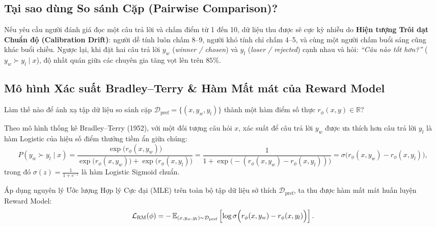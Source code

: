 \subsection{Tại sao dùng So sánh Cặp (Pairwise Comparison)?}
Nếu yêu cầu người đánh giá đọc một câu trả lời và chấm điểm từ 1 đến 10, dữ liệu thu được sẽ cực kỳ nhiễu do \textbf{Hiện tượng Trôi dạt Chuẩn độ (Calibration Drift)}: người dễ tính luôn chấm 8--9, người khó tính chỉ chấm 4--5, và cùng một người chấm buổi sáng cũng khác buổi chiều.
Ngược lại, khi đặt hai câu trả lời $y_w$ (\textit{winner / chosen}) và $y_l$ (\textit{loser / rejected}) cạnh nhau và hỏi: \textit{``Câu nào tốt hơn?''} ($y_w \succ y_l \mid x$), độ nhất quán giữa các chuyên gia tăng vọt lên trên $85\%$.

\subsection{Mô hình Xác suất Bradley--Terry \& Hàm Mất mát của Reward Model}
Làm thế nào để ánh xạ tập dữ liệu so sánh cặp $\mathcal{D}_{\text{pref}} = \{(x, y_w, y_l)\}$ thành một hàm điểm số thực $r_\phi(x, y) \in \mathbb{R}$?

\begin{definition}
Theo mô hình thống kê Bradley--Terry (1952), với một đối tượng câu hỏi $x$, xác suất để câu trả lời $y_w$ được ưa thích hơn câu trả lời $y_l$ là hàm Logistic của hiệu số điểm thưởng tiềm ẩn giữa chúng:
\begin{equation}
    P(y_w \succ y_l \mid x) = \frac{\exp\big(r_\phi(x, y_w)\big)}{\exp\big(r_\phi(x, y_w)\big) + \exp\big(r_\phi(x, y_l)\big)} = \frac{1}{1 + \exp\big(-(r_\phi(x, y_w) - r_\phi(x, y_l))\big)} = \sigma\big(r_\phi(x, y_w) - r_\phi(x, y_l)\big),
    \label{eq:bradley_terry}
\end{equation}
trong đó $\sigma(z) = \frac{1}{1 + e^{-z}}$ là hàm Logistic Sigmoid chuẩn.
\end{definition}

Áp dụng nguyên lý Ước lượng Hợp lý Cực đại (MLE) trên toàn bộ tập dữ liệu sở thích $\mathcal{D}_{\text{pref}}$, ta thu được hàm mất mát huấn luyện Reward Model:
\begin{equation}
    \mathcal{L}_{\text{RM}}(\phi) = -\operatorname{\mathbb{E}}_{(x, y_w, y_l) \sim \mathcal{D}_{\text{pref}}} \left[ \log \sigma\Big(r_\phi(x, y_w) - r_\phi(x, y_l)\Big) \right].
    \label{eq:rm_loss}
\end{equation}

